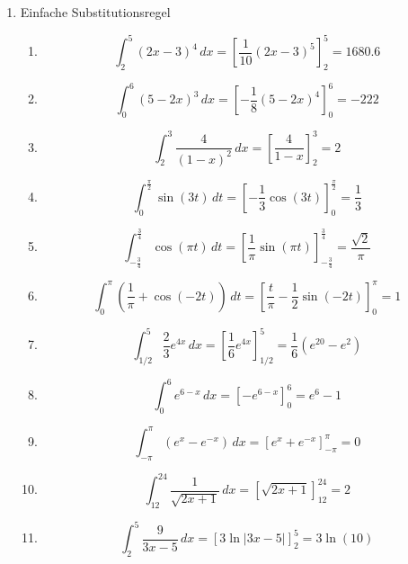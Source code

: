 \begin{enumerate}
	\item Einfache Substitutionsregel
	      \begin{enumerate}
		      \item
		            \[
			            \int_2^5 (2x-3)^4\,dx
			            = \left[\frac{1}{10}(2x-3)^5\right]_2^5
			            = 1680.6
		            \]
		      \item
		            \[
			            \int_0^6 (5-2x)^3\,dx
			            = \left[-\frac{1}{8}(5-2x)^4\right]_0^6
			            = -222
		            \]
		      \item
		            \[
			            \int_2^3 \frac{4}{(1-x)^2}\,dx
			            = \left[\frac{4}{1-x}\right]_2^3
			            = 2
		            \]
		      \item
		            \[
			            \int_0^{\frac{\pi}{2}} \sin(3t)\,dt
			            = \left[-\frac{1}{3}\cos(3t)\right]_0^{\frac{\pi}{2}}
			            = \frac{1}{3}
		            \]
		      \item
		            \[
			            \int_{-\frac{3}{4}}^{\frac{3}{4}} \cos(\pi t)\,dt
			            = \left[\frac{1}{\pi}\sin(\pi t)\right]_{-\frac{3}{4}}^{\frac{3}{4}}
			            = \frac{\sqrt{2}}{\pi}
		            \]
		      \item
		            \[
			            \int_0^\pi \left(\frac{1}{\pi}+\cos(-2t)\right)\,dt
			            = \left[\frac{t}{\pi}-\frac{1}{2}\sin(-2t)\right]_0^\pi
			            = 1
		            \]
		      \item
		            \[
			            \int_{1/2}^5 \frac{2}{3}e^{4x}\,dx
			            = \left[\frac{1}{6}e^{4x}\right]_{1/2}^5
			            = \frac{1}{6}\left(e^{20}-e^2\right)
		            \]
		      \item
		            \[
			            \int_0^6 e^{6-x}\,dx
			            = \left[-e^{6-x}\right]_0^6
			            = e^6-1
		            \]
		      \item
		            \[
			            \int_{-\pi}^{\pi} (e^x-e^{-x})\,dx
			            = \left[e^x+e^{-x}\right]_{-\pi}^{\pi}
			            = 0
		            \]
		      \item
		            \[
			            \int_{12}^{24} \frac{1}{\sqrt{2x+1}}\,dx
			            = \left[\sqrt{2x+1}\right]_{12}^{24}
			            = 2
		            \]
		      \item
		            \[
			            \int_2^5 \frac{9}{3x-5}\,dx
			            = \left[3\ln|3x-5|\right]_2^5
			            = 3\ln(10)
		            \]
	      \end{enumerate}
\end{enumerate}

